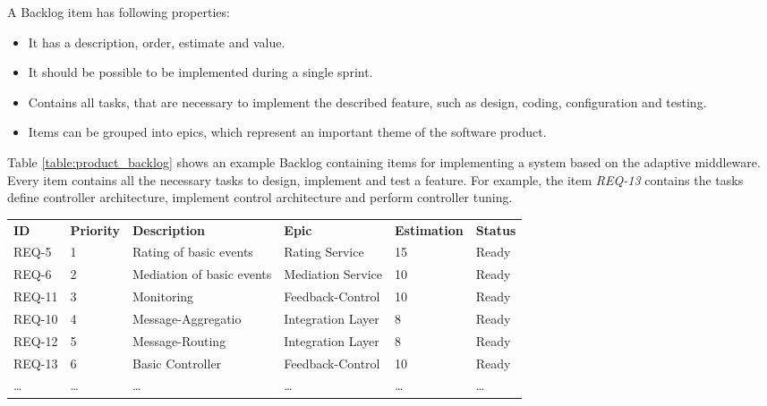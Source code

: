 A Backlog item has following properties:
\begin{itemize}
	\item It has a description, order, estimate and value.
	\item It should be possible to be implemented during a single sprint.
	\item Contains all tasks, that are necessary to implement the described feature, such as design, coding, configuration and testing.
	\item Items can be grouped into epics, which represent an important theme of the software product.
\end{itemize}

Table \ref{table:product_backlog} shows an example Backlog containing items for implementing a system based on the adaptive middleware.
Every item contains all the necessary tasks to design, implement and test a feature. For example, the item \emph{REQ-13} contains the tasks define controller architecture, implement control architecture and perform controller tuning.

\begin{landscape}
	\begin{tabularx}{\columnwidth}{@{} l X X X X X @{}}
		\caption{Example Product Backlog} \label{table:product_backlog}\\
		\toprule
		\bfseries ID & \bfseries Priority & \bfseries Description & \bfseries Epic & \bfseries Estimation & \bfseries Status \\
		REQ-5 & 1 & Rating of basic events & Rating Service & 15 & Ready\\
		REQ-6 & 2 & Mediation of basic events & Mediation Service & 10 & Ready\\
		REQ-11 & 3 & Monitoring & Feedback-Control & 10 & Ready\\
		REQ-10 & 4 & Message-Aggregatio & Integration Layer & 8 & Ready\\
		REQ-12 & 5 & Message-Routing & Integration Layer & 8 & Ready\\
		REQ-13 & 6 & Basic Controller & Feedback-Control & 10 & Ready\\
		\ldots & \ldots & \ldots & \ldots & \ldots & \ldots\\
		\bottomrule
	\end{tabularx}
\end{landscape}

